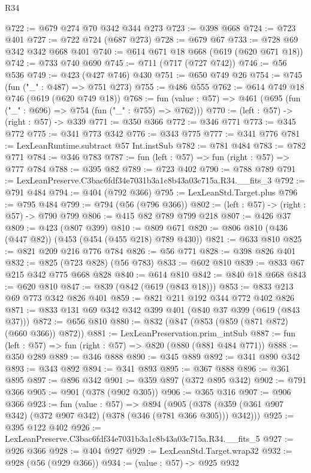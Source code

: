 \begin{lexlean}{R34}
\begin{coremodule}
@722 := @679 @274 @70 @342 @344 @273
@723 := @398 @668
@724 := @723 @401
@727 := @722 @724 (@687 @273)
@728 := @679 @67
@733 := @728 @69 @342 @342 @668 @401
@740 := @614 @671 @18 @668 (@619 (@620 @671 @18))
@742 := @733 @740 @690
@745 := @711 (@717 (@727 @742))
@746 := @56 @536
@749 := @423 (@427 @746) @430
@751 := @650 @749 @26
@754 := @745 (fun ("_" : @487) => @751 @273)
@755 := @486 @555
@762 := @614 @749 @18 @746 (@619 (@620 @749 @18))
@768 := fun (value : @57) => @461 (@695 (fun ("_" : @696) => @754 (fun ("_" : @755) => @762)))
@770 := (left : @57) -> (right : @57) -> @339
@771 := @350 @366
@772 := @346 @771
@773 := @345 @772
@775 := @341 @773 @342
@776 := @343 @775
@777 := @341 @776
@781 := LexLeanRuntime.subtract @57 Int.instSub
@782 := @781 @484
@783 := @782 @771
@784 := @346 @783
@787 := fun (left : @57) => fun (right : @57) => @777 @784
@788 := @395 @82
@789 := @723 @402
@790 := @788 @789
@791 := LexLeanPreserve.C3bac6fdf34e7031b3a1c8b43a03c715a.R34.__fits_3
@792 := @791 @484
@794 := @404 (@792 @366)
@795 := LexLeanStd.Target.plus
@796 := @795 @484
@799 := @794 (@56 (@796 @366))
@802 := (left : @57) -> (right : @57) -> @790 @799
@806 := @415 @82 @789 @799 @218
@807 := @426 @37
@809 := @423 (@807 @399)
@810 := @809 @671
@820 := @806 @810 (@436 (@447 @82)) (@453 (@454 (@455 @218) @789 @430))
@821 := @633 @810
@825 := @821 @209 @216 @776 @784
@826 := @56 @771
@828 := @398 @826 @401
@832 := @825 (@723 @828) (@56 @783)
@833 := @602 @810
@839 := @833 @67 @215 @342 @775 @668 @828
@840 := @614 @810
@842 := @840 @18 @668
@843 := @620 @810
@847 := @839 (@842 (@619 (@843 @18)))
@853 := @833 @213 @69 @773 @342 @826 @401
@859 := @821 @211 @192 @344 @772 @402 @826
@871 := @833 @131 @69 @342 @342 @399 @401 (@840 @37 @399 (@619 (@843 @37)))
@872 := @656 @810
@880 := @832 (@847 (@853 (@859 (@871 @872) (@660 @366)) @872))
@881 := LexLeanPreservation.prim_intSub
@887 := fun (left : @57) => fun (right : @57) => @820 (@880 (@881 @484 @771))
@888 := @350 @289
@889 := @346 @888
@890 := @345 @889
@892 := @341 @890 @342
@893 := @343 @892
@894 := @341 @893
@895 := @367 @888
@896 := @361 @895
@897 := @896 @342
@901 := @359 @897 (@372 @895 @342)
@902 := @791 @366
@905 := @901 (@378 (@902 @305))
@906 := @365 @316
@907 := @906 @366
@923 := fun (value : @57) =>
  @894 (@905 (@378 (@359 (@361 @907 @342) (@372 @907 @342) (@378 (@346 (@781 @366 @305))) @342)))
@925 := @395 @122 @402
@926 := LexLeanPreserve.C3bac6fdf34e7031b3a1c8b43a03c715a.R34.__fits_5
@927 := @926 @366
@928 := @404 @927
@929 := LexLeanStd.Target.wrap32
@932 := @928 (@56 (@929 @366))
@934 := (value : @57) -> @925 @932

\end{coremodule}
\end{lexlean}

